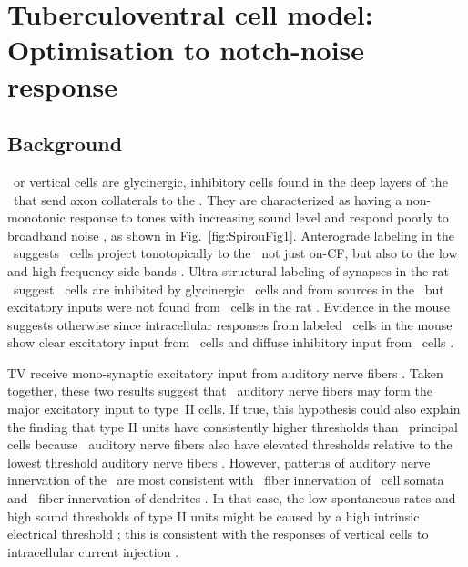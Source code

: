 
\section[TV Cell Model]{Tuberculoventral cell model: Optimisation to notch-noise response \label{sec:TV-cell-model}}

\subsection{Background}

\TV~or vertical cells are glycinergic, inhibitory cells found in the deep layers of the \DCN~that send axon collaterals to the \VCN\@.
They are characterized as having a non-monotonic response to tones with increasing sound level and respond poorly to broadband noise \citep{SpirouDavisEtAl:1999,NelkenYoung:1997,ReissYoung:2005}, as shown in Fig.~\ref{fig:SpirouFig1}.
Anterograde labeling in the \DCN~suggests \TV~cells project tonotopically to the \VCN~not just on-CF, but also to the low and high frequency side bands \citep{MunirathinamOstapoffEtAl:2004,OstapoffMorestEtAl:1999}.
Ultra-structural labeling of synapses in the rat \DCN~suggest \TV~cells are inhibited by glycinergic \DS~cells and from sources in the \DCN~but excitatory inputs were not found from \TS~cells in the rat \citep{Rubio:2005}.
Evidence in the mouse suggests otherwise since intracellular responses from labeled \TV~cells in the mouse show clear excitatory input from \TS~cells and diffuse inhibitory input from \DS~cells \citep{ZhangOertel:1993b,WickesbergOertel:1993}.


TV receive mono-synaptic excitatory input from auditory nerve ﬁbers \citep{OertelWu:1989,ZhangOertel:1993b}.
Taken together, these two results suggest that \LSR~auditory nerve ﬁbers may form the major excitatory input to type~II cells.
If true, this hypothesis could also explain the ﬁnding that type II units have consistently higher thresholds than \DCN~principal cells \citep{YoungBrownell:1976} because \LSR~auditory nerve ﬁbers also have elevated thresholds relative to the lowest threshold auditory nerve ﬁbers \citep{Liberman:1978}.
However, patterns of auditory nerve innervation of the \DCN~are most consistent with \HSR~ﬁber innervation of \TV~cell somata and \LSR~ﬁber innervation of dendrites \citep{Liberman:1993}.
In that case, the low spontaneous rates and high sound thresholds of type II units might be caused by a high intrinsic electrical threshold \citep{HancockDavisEtAl:1997}; this is consistent with the responses of vertical cells to intracellular current injection \citep{DingVoigt:1997,ZhangOertel:1993b}.

